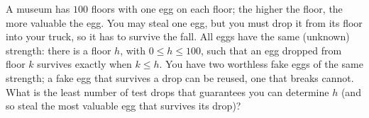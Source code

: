 A museum has $100$ floors with one egg on each floor; the higher the floor, the more valuable the egg. You may steal one egg, but you must drop it from its floor into your truck, so it has to survive the fall. All eggs have the same (unknown) strength: there is a floor $h$, with $0\le h\le100$, such that an egg dropped from floor $k$ survives exactly when $k\le h$. You have two worthless fake eggs of the same strength; a fake egg that survives a drop can be reused, one that breaks cannot. What is the least number of test drops that guarantees you can determine $h$ (and so steal the most valuable egg that survives its drop)?
